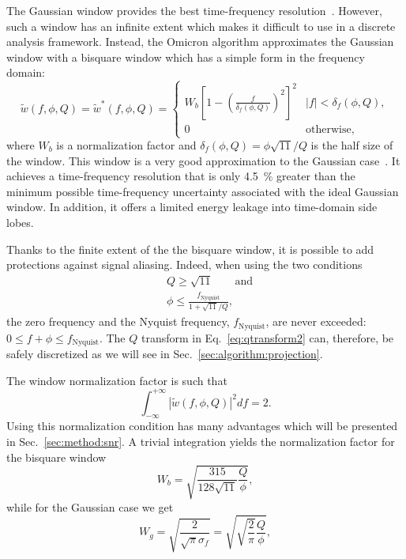 The Gaussian window provides the best time-frequency resolution~\cite{Gabor:1946}. However, such a window has an infinite extent which makes it difficult to use in a discrete analysis framework. Instead, the Omicron algorithm approximates the Gaussian window with a bisquare window which has a simple form in the frequency domain:
\begin{equation}
  \tilde{w}(f,\phi,Q) = \tilde{w}^*(f,\phi,Q) =
  \begin{cases}
    W_b\left[1 - \left(\frac{f}{\delta_f(\phi,Q)}\right)^2 \right]^2 & |f| < \delta_f(\phi,Q), \\
    0 & \textrm{otherwise},
  \end{cases}
  \label{eq:bisquare}
\end{equation}
where $W_b$ is a normalization factor and $\delta_f(\phi,Q)=\phi\sqrt{11}/Q$ is the half size of the window. This window is a very good approximation to the Gaussian case~\cite{Chatterji:2004}. It achieves a time-frequency resolution that is only 4.5~\% greater than the minimum possible time-frequency uncertainty associated with the ideal Gaussian window. In addition, it offers a limited energy leakage into time-domain side lobes.

Thanks to the finite extent of the the bisquare window, it is possible to add protections against signal aliasing. Indeed, when using the two conditions
\begin{align}
  &Q\ge\sqrt{11} \qquad \text{and}\label{eq:antialias1} \\
  &\phi \le \frac{f_{\text{Nyquist}}}{1+\sqrt{11}/Q}, \label{eq:antialias2}
\end{align}
the zero frequency and the Nyquist frequency, $f_{\text{Nyquist}}$, are never exceeded: $0 \le f + \phi \le f_{\text{Nyquist}}$. The $Q$ transform in Eq.~\ref{eq:qtransform2} can, therefore, be safely discretized as we will see in Sec.~\ref{sec:algorithm:projection}.

The window normalization factor is such that
\begin{equation}
  \int_{-\infty}^{+\infty}{|\tilde{w}(f,\phi,Q)|^2df} = 2.
  \label{eq:winnorm}
\end{equation}
Using this normalization condition has many advantages which will be presented in Sec.~\ref{sec:method:snr}. A trivial integration yields the normalization factor for the bisquare window
\begin{equation}
  W_b = \sqrt{\frac{315}{128\sqrt{11}} \frac{Q}{\phi}},
  \label{eq:Wb}
\end{equation}
while for the Gaussian case we get
\begin{equation}
  W_g = \sqrt{\frac{2}{\sqrt{\pi}\sigma_f}} = \sqrt{\sqrt{\frac{2}{\pi}} \frac{Q}{\phi}},
  \label{eq:Wg}
\end{equation}

